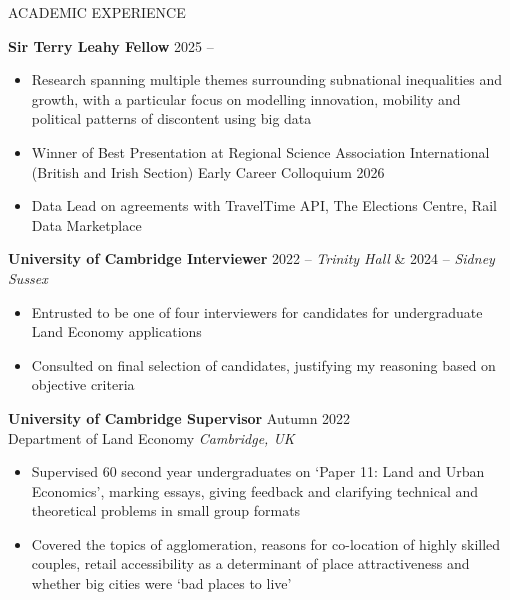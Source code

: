 \documentclass{resume}
\begin{document}
\begin{rSection}{ACADEMIC EXPERIENCE}

\textbf{Sir Terry Leahy Fellow} \hfill  \hfill 2025 -- 
\vspace{-0.5em}
 \begin{itemize}
  \itemsep -3pt {} 
   \item Research spanning multiple themes surrounding subnational inequalities and growth, with a particular focus on modelling innovation, mobility and political patterns of discontent using big data
 \item Winner of Best Presentation at Regional Science Association International (British and Irish Section) Early Career Colloquium 2026
   \item Data Lead on agreements with TravelTime API, The Elections Centre, Rail Data Marketplace
 \end{itemize}

\textbf{University of Cambridge Interviewer} \hfill  \hfill 2022 -- \textit{Trinity Hall}  \& 2024 -- \textit{Sidney Sussex}
\vspace{-0.5em}
 \begin{itemize}
    \itemsep -3pt {} 
     \item Entrusted to be one of four interviewers for candidates for undergraduate Land Economy applications 
     \item Consulted on final selection of candidates, justifying my reasoning based on objective criteria
 \end{itemize}

\textbf{University of Cambridge Supervisor} \hfill Autumn 2022 \\
Department of Land Economy \hfill \textit{Cambridge, UK}
\vspace{-0.5em}
 \begin{itemize}
    \itemsep -3pt {} 
     \item Supervised 60 second year undergraduates on `Paper 11: Land and Urban Economics', marking essays, giving feedback and clarifying technical and theoretical problems in small group formats
     \item Covered the topics of agglomeration, reasons for co-location of highly skilled couples, retail accessibility as a determinant of place attractiveness and whether big cities were `bad places to live'
 \end{itemize}

\end{rSection}
\end{document}
